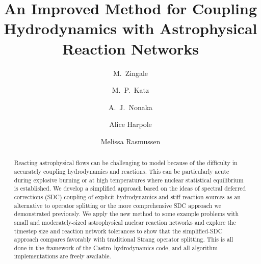 \documentclass{aastex63}
\newcommand{\castro}{{\sf Castro}}
\begin{document}
\title{An Improved Method for Coupling Hydrodynamics with Astrophysical Reaction Networks}



\shortauthors{}

\author[0000-0001-8401-030X]{M.~Zingale}

\author[0000-0003-0439-4556]{M.~P.~Katz}

\author[0000-0003-1791-0265]{A.~J.~Nonaka}

\author[0000-0002-1530-781X]{Alice Harpole}

\author{Melissa Rasmussen}



\begin{abstract}
Reacting astrophysical flows can be challenging to model because of
the difficulty in accurately coupling hydrodynamics and reactions.
This can be particularly acute during explosive burning or at high
temperatures where nuclear statistical equilibrium is established.  We
develop a simplified approach based on the ideas of spectral deferred
corrections (SDC) coupling of explicit hydrodynamics and stiff
reaction sources as an alternative to operator splitting or the more
comprehensive SDC approach we demonstrated previously.  We apply the
new method to some example problems with small and moderately-sized
astrophysical nuclear reaction networks and explore the timestep size
and reaction network tolerances to show that the simplified-SDC
approach compares favorably with traditional Strang operator
splitting.  This is all done in the framework of the
\castro\ hydrodynamics code, and all algorithm implementations are
freely available.
\end{abstract}
\end{document}
